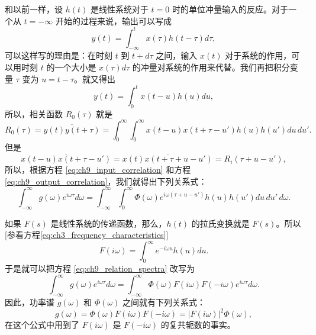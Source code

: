 和以前一样，设 $ h(t) $ 是线性系统对于 $ t=0 $ 时的单位冲量输入的反应。对于一个从 $ t=-\infty $ 开始的过程来说，输出可以写成
\begin{equation*}
y(t) = \int_{-\infty}^{t} x(\tau) h(t-\tau) d\tau,
\end{equation*}
可以这样写的理由是：在时刻 $ t $ 到 $ t+d\tau $ 之间，输入 $ x(t) $ 对于系统的作用，可以用时刻 $ t $ 的一个大小是 $ x(\tau) d\tau $ 的冲量对系统的作用来代替。我们再把积分变量 $ \tau $ 变为 $ u=t-\tau $。就又得出
\begin{equation}\label{eq:ch9_output_convolution}
y(t) = \int_{0}^{t} x(t-u) h(u) du,
\end{equation}
所以，相关函数 $ R_0(\tau) $ 就是
\begin{equation*}
R_0(\tau) = \overline{y(t) y(t+\tau)} = \int_{0}^{\infty} \int_{0}^{\infty} x(t-u) x(t+\tau-u') h(u) h(u') du\, du'.
\end{equation*}
但是
\begin{equation*}
\overline{x(t-u) x(t+\tau-u')} = \overline{x(t) x(t+\tau+u-u')} = R_i(\tau+u-u'),
\end{equation*}
所以，根据方程 \eqref{eq:ch9_input_correlation} 和方程 \eqref{eq:ch9_output_correlation}，我们就得出下列关系式：
\begin{equation}\label{eq:ch9_relation_spectra}
\int_{-\infty}^{\infty} g(\omega) e^{i\omega \tau} d\omega = \int_{-\infty}^{\infty} \int_{0}^{\infty} \Phi(\omega) e^{i\omega (\tau+u-u')} h(u) h(u') du\, du'\, d\omega.
\end{equation}

如果 $ F(s) $ 是线性系统的传递函数，那么，$ h(t) $ 的拉氏变换就是 $ F(s) $。所以 [参看方程\eqref{eq:ch3_frequency_characteristics}]
\begin{equation*}
F(i\omega) = \int_{0}^{\infty} e^{-i\omega u} h(u) du.
\end{equation*}
于是就可以把方程 \eqref{eq:ch9_relation_spectra} 改写为
\begin{equation*}
\int_{-\infty}^{\infty} g(\omega) e^{i\omega \tau} d\omega = \int_{-\infty}^{\infty} \Phi(\omega) F(i\omega) F(-i\omega) e^{i\omega \tau} d\omega.
\end{equation*}
因此，功率谱 $ g(\omega) $ 和 $ \Phi(\omega) $ 之间就有下列关系式：
\begin{equation}\label{eq:ch9_output_power_spectrum}
g(\omega) = \Phi(\omega) F(i\omega) F(-i\omega) = |F(i\omega)|^2 \Phi(\omega),
\end{equation}
在这个公式中用到了 $ F(i\omega) $ 是 $ F(-i\omega) $ 的复共轭数的事实。

